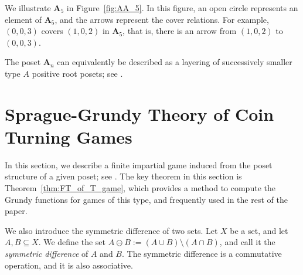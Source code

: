 \documentclass[a4paper,11pt]{amsart}
\theoremstyle{definition}
\numberwithin{equation}{section}
\def\ASM#1{\boldsymbol{A}_{#1}}
\begin{document}
%
We illustrate $\ASM{5}$ in Figure~\ref{fig:AA_5}.
In this figure, an open circle represents an element of $\ASM{5}$,
and the arrows represent the cover relations.
For example,
$(0, 0, 3)$ covers $(1, 0, 2)$ in $\ASM{5}$,
that is, there is an arrow from $(1, 0, 2)$ to $(0, 0, 3)$.
%
%
\par
%
The poset $\ASM{n}$
can equivalently be described as a layering of successively smaller type $A$ positive root posets; see \cite{SW}.
%
%

%
%
%
%
%
\section{Sprague-Grundy Theory of Coin Turning Games}\label{sc:PosetGame}
%
In this section, we describe a finite impartial game induced from the poset structure of a given poset; see \cite{Lenstra,Sato}.
The key theorem in this section is Theorem~\ref{thm:FT_of_T_game},
which provides a method to compute the Grundy functions for games of this type,
and frequently used in the rest of the paper.
%
\par
%
We also introduce the symmetric difference of two sets.
Let $X$ be a set,
and let $A,B\subseteq X$.
We define the set
$A \ominus B:=\left( A \cup B \right) \setminus \left( A \cap B \right)$,
and call it the \textsl{symmetric difference} of $A$ and $B$.
The symmetric difference is a commutative operation, and it is also associative.
%
\end{document}
